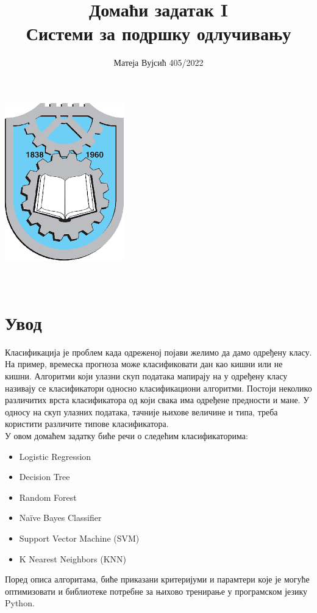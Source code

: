 \documentclass[11pt]{article} %
\title{Домаћи задатак I \\  Системи за подршку одлучивању}
\author{Матеја Вујсић 405/2022}
\begin{document}
\makeatletter
    \begin{titlepage}
        \begin{center}
            \includegraphics[width=0.2\linewidth]{grb-faks.png}\\[7ex]
            {\huge \bfseries  \@title }\\[2ex] 
            {\LARGE  \@author}\\[50ex] 
            {\large \@date}
        \end{center}
    \end{titlepage}
\makeatother
\thispagestyle{empty}
\newpage
\newpage

\doublespacing
\tableofcontents
\singlespacing

\newpage
\section{Увод}
Класификација је проблем када одреженој појави желимо да дамо одређену класу. На пример, времеска прогноза може класификовати дан као кишни или не кишни. Алгоритми који улазни скуп података мапирају на у одређену класу називају се класификатори односно класификациони алгоритми. Постоји неколико различитих врста класификатора од који свака има одређене предности и мане. У односу на скуп улазних података, тачније њихове величине и типа, треба користити различите типове класификатора. \\
\linebreak
У овом домаћем задатку биће речи о следећим класификаторима:
\begin{itemize}
	\item Logistic Regression
	\item Decision Tree
	\item Random Forest
	\item Naïve Bayes Classifier
	\item Support Vector Machine (SVM)
	\item K Nearest Neighbors (KNN)
\end{itemize}

Поред описа алгоритама, биће приказани критеријуми и парамтери које је могуће оптимизовати и библиотеке потребне за њихово тренирање у програмском језику Python.  
\newpage
\end{document}
